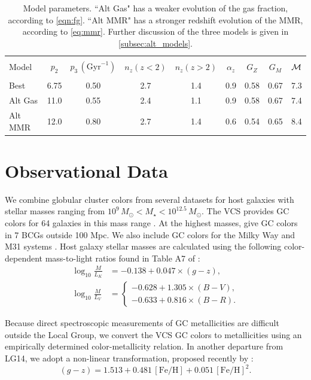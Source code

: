 \documentclass[fleqn,usenatbib]{mnras}
\newcommand{\Msun}{\,M_{\odot}}
\newcommand{\Mstar}{M_{\star}}
\newcommand{\feh}{\mathrm{[Fe/H]}}
\begin{document}
\begin{table}
\centering
\begin{tabular}{lccccc|ccc}
\hline\\[-2mm]
Model & $p_2$ & $p_3\,(\mathrm{Gyr}^{-1})$ & $n_z(z<2)$ & $n_z(z>2)$ & $\alpha_z$ & $G_{Z}$ & $G_{M}$ & ${\cal M}$ \\[1mm]
\hline\\[-2mm]
Best    & 6.75 & 0.50 & 2.7 & 1.4 & 0.9 & 0.58 & 0.67 & 7.3 \\
Alt Gas & 11.0 & 0.55 & 2.4 & 1.1 & 0.9 & 0.58 & 0.67 & 7.4 \\
Alt MMR & 12.0 & 0.80 & 2.7 & 1.4 & 0.6 & 0.54 & 0.65 & 8.4 \\
\hline
\end{tabular}
\caption{\small Model parameters. ``Alt Gas" has a weaker evolution of the gas fraction, according to \autoref{eqn:fg}. ``Alt MMR" has a stronger redshift evolution of the MMR, according to \autoref{eq:mmr}. Further discussion of the three models is given in \autoref{subsec:alt_models}.}
  \label{tab:models}
\end{table}

\section{Observational Data}
\label{sec:observations}

We combine globular cluster colors from several datasets for host galaxies with stellar masses ranging from $10^{9}\Msun < \Mstar < 10^{12.5}\Msun$. The VCS provides GC colors for 64 galaxies in this mass range \citep{peng_etal06}. At the highest masses, \citet[][hereafter H14]{harris_etal14_bcg1} give GC colors in 7 BCGs outside 100 Mpc. We also include GC colors for the Milky Way \citep{harris96} and M31 systems \citep{huxor_etal_2014}. Host galaxy stellar masses are calculated using the following color-dependent mass-to-light ratios found in Table A7 of \cite{bell_etal03}:
\begin{align}
\log_{10}\frac{M}{L_K} &= -0.138 + 0.047\times (g-z) ,\\
\log_{10}\frac{M}{L_V} &= \begin{cases} -0.628 + 1.305\times (B-V),\\
 -0.633 + 0.816\times (B-R). \end{cases}
\label{eqn:ml}
\end{align}

Because direct spectroscopic measurements of GC metallicities are difficult outside the Local Group, we convert the VCS GC colors to metallicities using an empirically determined color-metallicity relation. In another departure from LG14, we adopt a non-linear transformation, proposed recently by \cite{harris_etal17_bcg3}:
\begin{equation}
  (g-z) = 1.513 + 0.481 \,\feh + 0.051 \,\feh^2.
  \label{eq:color-met}
\end{equation}
\end{document}
